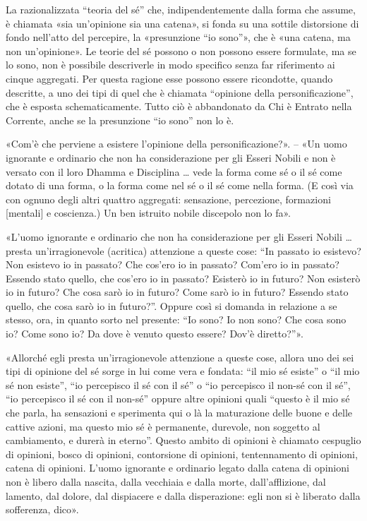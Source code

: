  La razionalizzata “teoria del sé” che,
indipendentemente dalla forma che assume, è chiamata «sia un’opinione sia una
catena», si fonda su una sottile distorsione di fondo nell’atto del percepire,
la «presunzione “io sono”», che è «una catena, ma non un’opinione». Le teorie
del sé possono o non possono essere formulate, ma se lo sono, non è possibile
descriverle in modo specifico senza far riferimento ai cinque aggregati. Per
questa ragione esse possono essere ricondotte, quando descritte, a uno dei tipi
di quel che è chiamata “opinione della personificazione”,
che è esposta schematicamente. Tutto ciò è abbandonato da Chi è Entrato nella
Corrente, anche se la presunzione “io sono” non lo è.

\label{pag259}%
 «Com’è che perviene a esistere l’opinione della
personificazione?». – «Un uomo ignorante e ordinario che non ha considerazione
per gli Esseri Nobili e non è versato con il loro Dhamma e Disciplina … vede la
forma come sé o il sé come dotato di una forma, o la forma come nel sé o il sé
come nella forma. (E così via con ognuno degli altri quattro aggregati:
sensazione, percezione, formazioni [mentali] e coscienza.) Un ben istruito
nobile discepolo non lo fa».


«L’uomo ignorante e ordinario che non ha considerazione per gli Esseri Nobili …
presta un’irragionevole (acritica) attenzione a queste cose: “In passato io
esistevo? Non esistevo io in passato? Che cos’ero io in passato? Com’ero io in
passato? Essendo stato quello, che cos’ero io in passato? Esisterò io in futuro?
Non esisterò io in futuro? Che cosa sarò io in futuro? Come sarò io in futuro?
Essendo stato quello, che cosa sarò io in futuro?”. Oppure così si domanda in
relazione a se stesso, ora, in quanto sorto nel presente: “Io sono? Io non sono?
Che cosa sono io? Come sono io? Da dove è venuto questo essere? Dov’è
diretto?”».

«Allorché egli presta un’irragionevole attenzione a queste cose, allora uno dei
sei tipi di opinione del sé sorge in lui come vera e fondata: “il mio sé esiste”
o “il mio sé non esiste”, “io percepisco il sé con il sé” o “io percepisco il
non-sé con il sé”, “io percepisco il sé con il non-sé” oppure altre opinioni
quali “questo è il mio sé che parla, ha sensazioni e sperimenta qui o là la
maturazione delle buone e delle cattive azioni, ma questo mio sé è permanente,
durevole, non soggetto al cambiamento, e durerà in eterno”. Questo ambito di
opinioni è chiamato cespuglio di opinioni, bosco di opinioni, contorsione di
opinioni, tentennamento di opinioni, catena di opinioni. L’uomo ignorante e
ordinario legato dalla catena di opinioni non è libero dalla nascita, dalla
vecchiaia e dalla morte, dall’afflizione, dal lamento, dal dolore, dal
dispiacere e dalla disperazione: egli non si è liberato dalla sofferenza, dico».

